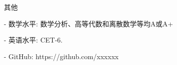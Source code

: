 \documentclass{resume} %
\begin{document}

\begin{rSection}{其他}
\begin{rSubsection}
{}{}{}{}
\item[-] 数学水平: 数学分析、高等代数和离散数学等均A或A+
\item[-] 英语水平: CET-6.
\item[-] GitHub: https://github.com/xxxxxx
\end{rSubsection}
\end{rSection}
\end{document}
